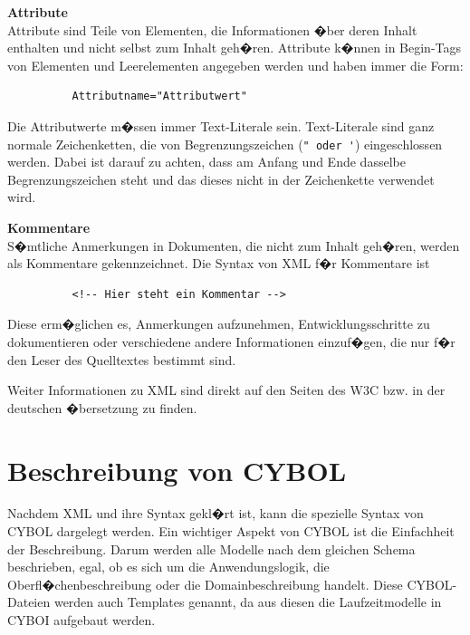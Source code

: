       \textbf{Attribute} \\
        Attribute sind Teile von Elementen, die Informationen �ber deren Inhalt enthalten und
        nicht selbst zum Inhalt geh�ren. Attribute k�nnen in Begin-Tags von Elementen und
        Leerelementen angegeben werden und haben immer die Form:
\begin{verbatim}
          Attributname="Attributwert"
\end{verbatim}
        Die Attributwerte m�ssen immer Text-Literale sein. 
        Text-Literale sind ganz normale Zeichenketten, die von Begrenzungszeichen 
        (\verb|" oder '|) eingeschlossen
        werden. Dabei ist darauf zu achten, dass am Anfang und Ende dasselbe
        Begrenzungszeichen steht und das dieses nicht in der Zeichenkette
        verwendet wird.
      
      \textbf{Kommentare} \\
        S�mtliche Anmerkungen in Dokumenten, die nicht zum Inhalt geh�ren, werden als
        Kommentare gekennzeichnet. Die Syntax von XML f�r Kommentare ist
\begin{verbatim}
          <!-- Hier steht ein Kommentar -->
\end{verbatim}
        Diese erm�glichen es, Anmerkungen aufzunehmen,
        Entwicklungsschritte zu dokumentieren oder verschiedene andere Informationen
        einzuf�gen, die nur f�r den Leser des Quelltextes bestimmt sind.

      Weiter Informationen zu XML sind direkt auf den Seiten des W3C \cite{w3c} 
      bzw. in der deutschen �bersetzung \cite{w3cger} zu finden.

  \section{Beschreibung von CYBOL}
  
    Nachdem XML und ihre Syntax gekl�rt ist, kann die spezielle Syntax von CYBOL 
    dargelegt werden. 
    Ein wichtiger Aspekt
    von CYBOL ist die Einfachheit der Beschreibung. Darum werden alle Modelle
    nach dem gleichen Schema beschrieben, egal, ob es sich um die Anwendungslogik,
    die Oberfl�chenbeschreibung oder die Domainbeschreibung handelt. Diese CYBOL-Dateien
    werden auch Templates genannt, da aus diesen die Laufzeitmodelle in CYBOI 
    aufgebaut werden. 
    
